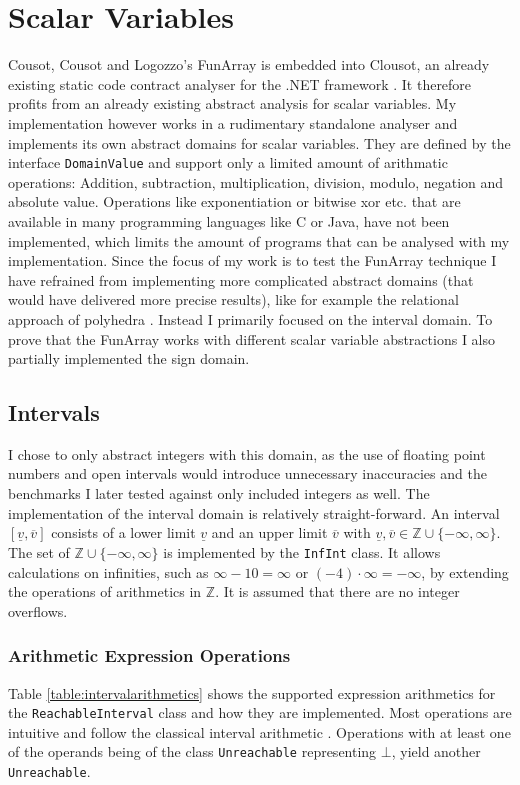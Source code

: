\section{Scalar Variables}\label{sec:scalarvariables}
Cousot, Cousot and Logozzo's FunArray is embedded into Clousot, an already existing static code contract analyser for the .NET framework \cite{cousot2011}. It therefore profits from an already existing abstract analysis for scalar variables. My implementation however works in a rudimentary standalone analyser and implements its own abstract domains for scalar variables.
They are defined by the interface \texttt{DomainValue} and support only a limited amount of arithmatic operations: Addition, subtraction, multiplication, division, modulo, negation and absolute value. Operations like exponentiation or bitwise xor etc. that are available in many programming languages like C or Java, have not been implemented, which limits the amount of programs that can be analysed with my implementation. 
Since the focus of my work is to test the FunArray technique I have refrained from implementing more complicated abstract domains (that would have delivered more precise results), like for example the relational approach of polyhedra \cite{cousot1978}. Instead I primarily focused on the interval domain. To prove that the FunArray works with different scalar variable abstractions I also partially implemented the sign domain.

\subsection{Intervals}
I chose to only abstract integers with this domain, as the use of floating point numbers and open intervals would introduce unnecessary inaccuracies and the benchmarks I later tested against only included integers as well. The implementation of the interval domain is relatively straight-forward. An interval $[\underline{v},\overline{v}]$ consists of a lower limit $\underline{v}$ and an upper limit $\overline{v}$ with $\underline{v},\overline{v} \in \mathbb{Z}\cup\{-\infty,\infty\}$. The set of $\mathbb{Z}\cup\{-\infty,\infty\}$ is implemented by the \texttt{InfInt} class. It allows calculations on infinities, such as $\infty - 10 = \infty$ or $(-4) \cdot \infty = -\infty$, by extending the operations of arithmetics in $\mathbb{Z}$. It is assumed that there are no integer overflows.

\subsubsection{Arithmetic Expression Operations}
Table \ref{table:intervalarithmetics} shows the supported expression arithmetics for the \texttt{ReachableInterval} class and how they are implemented. Most operations are intuitive and follow the classical interval arithmetic \cite{dawood2011}. Operations with at least one of the operands being of the class \texttt{Unreachable} representing $\bot$, yield another \texttt{Unreachable}. 

